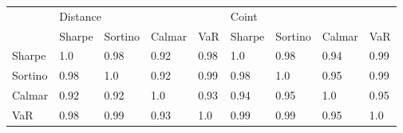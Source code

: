 \begin{tabular}{lllllllll}
\toprule
{} & \multicolumn{4}{l}{Distance} & \multicolumn{4}{l}{Coint} \\
{} &   Sharpe & Sortino & Calmar &   VaR & Sharpe & Sortino & Calmar &   VaR \\
\midrule
Sharpe  &      1.0 &    0.98 &   0.92 &  0.98 &    1.0 &    0.98 &   0.94 &  0.99 \\
Sortino &     0.98 &     1.0 &   0.92 &  0.99 &   0.98 &     1.0 &   0.95 &  0.99 \\
Calmar  &     0.92 &    0.92 &    1.0 &  0.93 &   0.94 &    0.95 &    1.0 &  0.95 \\
VaR     &     0.98 &    0.99 &   0.93 &   1.0 &   0.99 &    0.99 &   0.95 &   1.0 \\
\bottomrule
\end{tabular}
